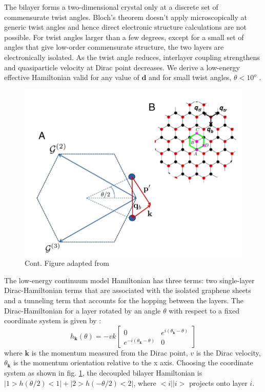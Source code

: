 The bilayer forms a two-dimensional crystal only at a discrete set of commensurate twist angles. Bloch's theorem doesn't apply microscopically at generic twist angles and hence direct electronic structure calculations are not possible. For twist angles larger than a few degrees, except for a small set of angles that give low-order commensurate structure, the two layers are electronically isolated. As the twist angle reduces, interlayer coupling strengthens and quasiparticle velocity at Dirac point decreases. We derive a low-energy effective Hamiltonian valid for any value of $\mathbf{d}$ and for small twist angles, $\theta<10^o$ \cite{Bistritzer12233}.
\begin{figure}[H]
    \centering
     \includegraphics[width=\textwidth]{figures/contmodel.jpg}
     \caption{Cont. Figure adapted from \cite{Bistritzer12233}}
     \label{fig:contmodel}
\end{figure}
The low-energy continuum model Hamiltonian has three terms: two single-layer Dirac-Hamiltonian terms that are associated with the isolated graphene sheets and a tunneling term that accounts for the hopping between the layers. The Dirac-Hamiltonian for a layer rotated by an angle $\theta$ with respect to a fixed coordinate system is given by \cite{Geim}:
\begin{equation}
    h_{\mathbf{k}}(\theta)=-vk \begin{bmatrix}
        0 & e^{i(\theta_{\mathbf{k}}-\theta)}\\
        e^{-i(\theta_{\mathbf{k}}-\theta)} & 0 
    \end{bmatrix}
\end{equation}
where $\mathbf{k}$ is the momentum measured from the Dirac point, $v$ is the Dirac velocity, $\theta_{\mathbf{k}}$ is the momentum orientation relative to the x axis. Choosing the coordinate system as shown in fig. \ref{fig:contmodel}, the decoupled bilayer Hamiltonian is $|1>h(\theta/2)<1|+|2>h(-\theta/2)<2|$, where $<i||i>$ projects onto layer $i$.

